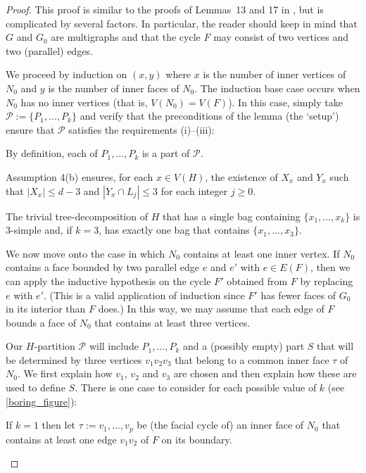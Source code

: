 \documentclass{patmorin}
\theoremstyle{plain}
\theoremstyle{definition}
\newcommand{\PP}{\mathcal{P}}
\renewcommand{\ge}{\geqslant}
\renewcommand{\le}{\leqslant}
\begin{document}
\begin{proof}
This proof is similar to the proofs of Lemmas~13 and 17 in \cite{DJMMUW20}, but is complicated by several factors.  In particular, the reader should keep in mind that $G$ and $G_0$ are multigraphs and that the cycle $F$ may consist of two vertices and two (parallel) edges.

We proceed by induction on $(x,y)$ where $x$ is the number of inner vertices of $N_0$ and $y$ is the number of inner faces of $N_0$.  The induction base case occurs when $N_0$ has no inner vertices (that is, $V(N_0)=V(F)$). In this case, simply take $\PP:=\{P_1,\ldots,P_k\}$ and verify that the preconditions of the lemma (the `setup') ensure that $\PP$ satisfies the requirements (i)--(iii):
  \begin{compactenum}[(i)]
    \item By definition, each of $P_1,\ldots,P_k$ is a part of $\mathcal{P}$.
    \item Assumption 4(b) ensures, for each $x\in V(H)$, the existence of $X_x$ and $Y_x$ such that $|X_x|\le d-3$ and $|Y_x\cap L_j|\le 3$ for each integer $j\ge 0$.
    \item The trivial tree-decomposition of $H$ that has a single bag containing $\{x_1,\ldots,x_k\}$ is $3$-simple and, if $k=3$, has exactly one bag that contains $\{x_1,\ldots,x_3\}$.
  \end{compactenum}

We now move onto the case in which $N_0$ contains at least one inner vertex. If $N_0$ contains a face bounded by two parallel edge $e$ and $e'$ with $e\in E(F)$, then we can apply the inductive hypothesis on the cycle $F'$ obtained from $F$ by replacing $e$ with $e'$. (This is a valid application of induction since $F'$ has fewer faces of $G_0$ in its interior than $F$ does.)  In this way, we may assume that each edge of $F$ bounds a face of $N_0$ that contains at least three vertices.

Our $H$-partition $\mathcal{P}$ will include $P_1,\dots,P_k$ and a (possibly empty) part $S$ that will be determined by three vertices $v_1v_2v_3$ that belong to a common inner face $\tau$ of $N_0$.  We first explain how $v_1$, $v_2$ and $v_3$ are chosen and then explain how these are used to define $S$.  There is one case to consider for each possible value of $k$ (see \cref{boring_figure}):

\begin{compactenum}
    \item If $k=1$ then let $\tau:=v_1,\ldots,v_p$ be (the facial cycle of) an inner face of $N_0$ that contains at least one edge $v_1v_2$ of $F$ on its boundary.


\end{compactenum}
\end{proof}
\end{document}
